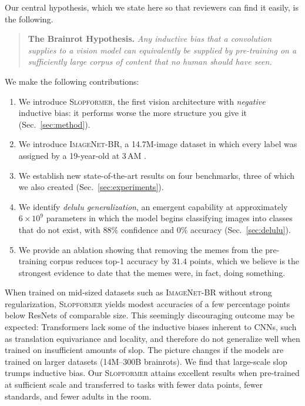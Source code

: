 \documentclass[10pt]{article}
\newcommand{\slop}{\textsc{Slopformer}}
\newcommand{\br}{\textsc{ImageNet-BR}}
\begin{document}
Our central hypothesis, which we state here so that reviewers can find it
easily, is the following.

\begin{quote}
\textbf{The Brainrot Hypothesis.} \emph{Any inductive bias that a convolution
supplies to a vision model can equivalently be supplied by pre-training on a
sufficiently large corpus of content that no human should have seen.}
\end{quote}

We make the following contributions:
\begin{enumerate}\itemsep0.15em
  \item We introduce \slop{}, the first vision architecture with \emph{negative}
        inductive bias: it performs worse the more structure you give it
        (Sec.~\ref{sec:method}).
  \item We introduce \br{}, a 14.7M-image dataset in which every label was
        assigned by a 19-year-old at 3\,AM \citep{ohio2024dataset}.
  \item We establish new state-of-the-art results on four benchmarks, three of
        which we also created (Sec.~\ref{sec:experiments}).
  \item We identify \emph{delulu generalization}, an emergent capability at
        approximately $6\times10^{9}$ parameters in which the model begins
        classifying images into classes that do not exist, with $88\%$
        confidence and $0\%$ accuracy (Sec.~\ref{sec:delulu}).
  \item We provide an ablation showing that removing the memes from the
        pre-training corpus reduces top-1 accuracy by $31.4$ points, which we
        believe is the strongest evidence to date that the memes were, in fact,
        doing something.
\end{enumerate}

When trained on mid-sized datasets such as \br{} without strong regularization,
\slop{} yields modest accuracies of a few percentage points below ResNets of
comparable size. This seemingly discouraging outcome may be expected:
Transformers lack some of the inductive biases inherent to CNNs, such as
translation equivariance and locality, and therefore do not generalize well
when trained on insufficient amounts of slop. The picture changes if the models
are trained on larger datasets (14M--300B brainrots). We find that large-scale
slop trumps inductive bias. Our \slop{} attains excellent results when
pre-trained at sufficient scale and transferred to tasks with fewer data
points, fewer standards, and fewer adults in the room.
\end{document}
